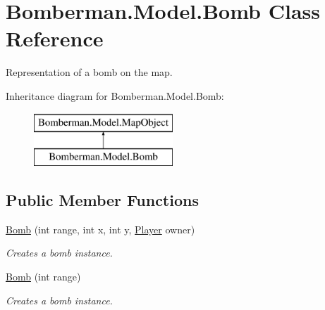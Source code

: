 \hypertarget{class_bomberman_1_1_model_1_1_bomb}{}\section{Bomberman.\+Model.\+Bomb Class Reference}
\label{class_bomberman_1_1_model_1_1_bomb}


Representation of a bomb on the map.  


Inheritance diagram for Bomberman.\+Model.\+Bomb\+:\begin{figure}[H]
\begin{center}
\leavevmode
\includegraphics[height=2.000000cm]{class_bomberman_1_1_model_1_1_bomb}
\end{center}
\end{figure}
\subsection*{Public Member Functions}
\begin{DoxyCompactItemize}
\item 
\mbox{\hyperlink{class_bomberman_1_1_model_1_1_bomb_a5c25fbb7b802004e8391ebb64b1fd7d6}{Bomb}} (int range, int x, int y, \mbox{\hyperlink{class_bomberman_1_1_model_1_1_player}{Player}} owner)
\begin{DoxyCompactList}\small\item\em Creates a bomb instance. \end{DoxyCompactList}\item 
\mbox{\hyperlink{class_bomberman_1_1_model_1_1_bomb_abed05b899b69c8dfa3fb0773ac6d34ff}{Bomb}} (int range)
\begin{DoxyCompactList}\small\item\em Creates a bomb instance. \end{DoxyCompactList}\end{DoxyCompactItemize}
